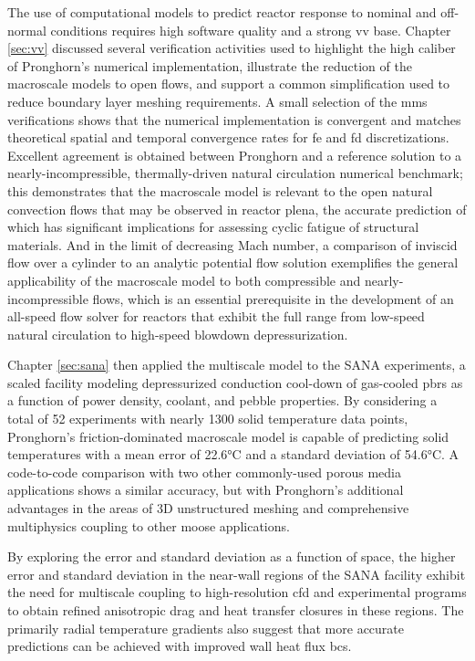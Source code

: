 The use of computational models to predict reactor response to nominal and off-normal conditions requires high software quality and a strong \gls{vv} base. Chapter \ref{sec:vv} discussed several verification activities used to highlight the high caliber of Pronghorn's numerical implementation, illustrate the reduction of the macroscale models to open flows, and support a common simplification used to reduce boundary layer meshing requirements. A small selection of the \gls{mms} verifications shows that the numerical implementation is convergent and matches theoretical spatial and temporal convergence rates for \gls{fe} and \gls{fd} discretizations. Excellent agreement is obtained between Pronghorn and a reference solution to a nearly-incompressible, thermally-driven natural circulation numerical benchmark; this demonstrates that the macroscale model is relevant to the open natural convection flows that may be observed in reactor plena, the accurate prediction of which has significant implications for assessing cyclic fatigue of structural materials. And in the limit of decreasing Mach number, a comparison of inviscid flow over a cylinder to an analytic potential flow solution exemplifies the general applicability of the macroscale model to both compressible and nearly-incompressible flows, which is an essential prerequisite in the development of an all-speed flow solver for reactors that exhibit the full range from low-speed natural circulation to high-speed blowdown depressurization.

Chapter \ref{sec:sana} then applied the multiscale model to the SANA experiments, a scaled facility modeling depressurized conduction cool-down of gas-cooled \glspl{pbr} as a function of power density, coolant, and pebble properties. By considering a total of 52 experiments with nearly 1300 solid temperature data points, Pronghorn's friction-dominated macroscale model is capable of predicting solid temperatures with a mean error of 22.6\si{\celsius} and a standard deviation of 54.6\si{\celsius}. A code-to-code comparison with two other commonly-used porous media applications shows a similar accuracy, but with Pronghorn's additional advantages in the areas of 3D unstructured meshing and comprehensive multiphysics coupling to other \gls{moose} applications.

By exploring the error and standard deviation as a function of space, the higher error and standard deviation in the near-wall regions of the SANA facility exhibit the need for multiscale coupling to high-resolution \gls{cfd} and experimental programs to obtain refined anisotropic drag and heat transfer closures in these regions. The primarily radial temperature gradients also suggest that more accurate predictions can be achieved with improved wall heat flux \glspl{bc}. 

